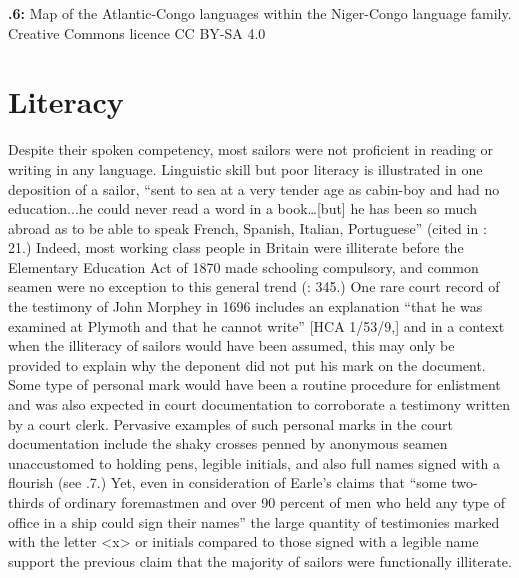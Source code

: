   
 

{\textbf{.6:}}{ Map of the Atlantic-Congo languages within the Niger-Congo language family. Creative Commons licence CC BY-SA 4.0} 

\section{\textbf{Literacy}}%

  Despite their spoken competency, most sailors were not proficient in reading or writing in any language. Linguistic skill but poor literacy is illustrated in one deposition of a sailor, “sent to sea at a very tender age as cabin-boy and had no education...he could never read a word in a book…[but] he has been so much abroad as to be able to speak French, Spanish, Italian, Portuguese” (cited in \citealt{Earle1998}: 21.) Indeed, most working class people in Britain were illiterate before the Elementary Education Act of 1870 made schooling compulsory, and common seamen were no exception to this general trend (\citealt{AdkinsAdkins2008}: 345.) One rare court record of the testimony of John Morphey in 1696 includes an explanation “that he was examined at Plymoth and that he cannot write” [HCA 1/53/9,] and in a context when the illiteracy of sailors would have been assumed, this may only be provided to explain why the deponent did not put his mark on the document. Some type of personal mark would have been a routine procedure for enlistment and was also expected in court documentation to corroborate a testimony written by a court clerk. Pervasive examples of such personal marks in the court documentation include the shaky crosses penned by anonymous seamen unaccustomed to holding pens, legible initials, and also full names signed with a flourish (see .7.) Yet, even in consideration of Earle’s claims that “some two-thirds of ordinary foremastmen and over 90 percent of men who held any type of office in a ship could sign their names” \citep[20,]{Earle1998} the large quantity of testimonies marked with the letter <x> or initials compared to those signed with a legible name support the previous claim that the majority of sailors were functionally illiterate. 

  
 

